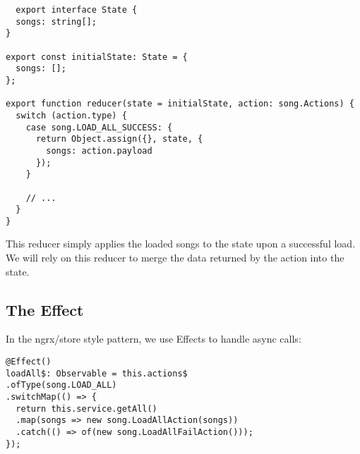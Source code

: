 \begin{lstlisting}
  export interface State {
  songs: string[];
}

export const initialState: State = {
  songs: [];
};

export function reducer(state = initialState, action: song.Actions) {
  switch (action.type) {
    case song.LOAD_ALL_SUCCESS: {
      return Object.assign({}, state, {
        songs: action.payload
      });
    }

    // ...
  }
}
\end{lstlisting}

This reducer simply applies the loaded songs to the state upon a successful
load.  We will rely on this reducer to merge the data returned by the action
into the state.

\subsection{The Effect}
In the ngrx/store style pattern, we use Effects to handle async calls:

\begin{lstlisting}
@Effect()
loadAll$: Observable = this.actions$
.ofType(song.LOAD_ALL)
.switchMap(() => {
  return this.service.getAll()
  .map(songs => new song.LoadAllAction(songs))
  .catch(() => of(new song.LoadAllFailAction()));
});
\end{lstlisting}
